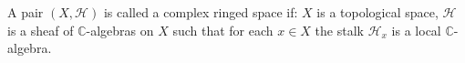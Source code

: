 A pair $(X, \mathcal{H})$ is called a complex ringed space if: $X$ is a topological space, $\mathcal{H}$ is a sheaf of $\mathbb{C}$-algebras on $X$ such that for each $x \in X$ the stalk $\mathcal{H}_x$ is a local $\mathbb{C}$-algebra.
